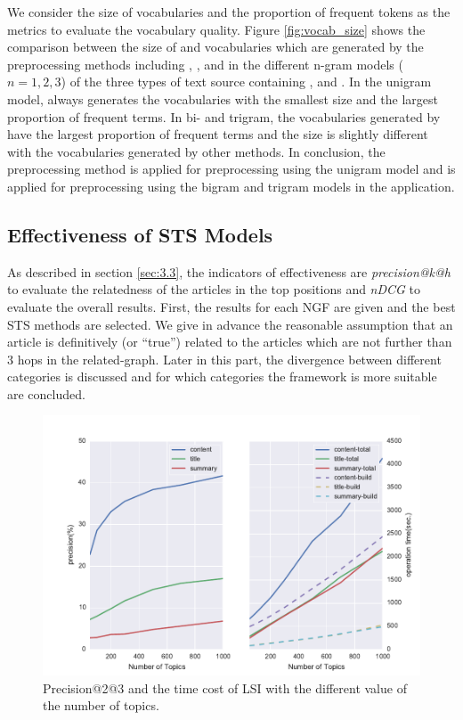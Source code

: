 We consider the size of \ifull{} vocabularies and the proportion of frequent tokens as the metrics to evaluate the vocabulary quality. Figure \ref{fig:vocab_size} shows the comparison between the size of \ifull{} and \icommon{} vocabularies which are generated by the preprocessing methods including \iSP{}, \iSE{}, \iST{} and \iSS{} in the different n-gram models ($n=1, 2, 3$) of the three types of text source containing \icontent{}, \ititle{} and \isummary{}. In the unigram model, \iSS{} always generates the vocabularies with the smallest size and the largest proportion of frequent terms. In bi- and trigram, the vocabularies generated by \iSE{} have the largest proportion of frequent terms and the size is slightly different with the vocabularies generated by other methods. In conclusion, the preprocessing method \iSS{} is applied for preprocessing using the unigram model and \iSE{} is applied for preprocessing using the bigram and trigram models in the application. 


\subsection{Effectiveness of STS Models}
\label{sec:5.2}


As described in section \ref{sec:3.3}, the indicators of effectiveness are \textit{precision@k@h} to evaluate the relatedness of the articles in the top positions and \textit{nDCG} to evaluate the overall results. First, the results for each NGF are given and the best STS methods are selected. We give in advance the reasonable assumption that an article is definitively (or ``true'') related to the articles which are not further than $3$ hops in the related-graph. Later in this part, the divergence between different categories is discussed and for which categories the framework is more suitable are concluded.  
\begin{figure}[!htb]
    \centering
    \includegraphics[width=\textwidth]{fig/precision_topics}
    \caption{Precision@2@3 and the time cost of LSI with the different value of the number of topics. }
    \label{fig:precision_topics}
\end{figure}


